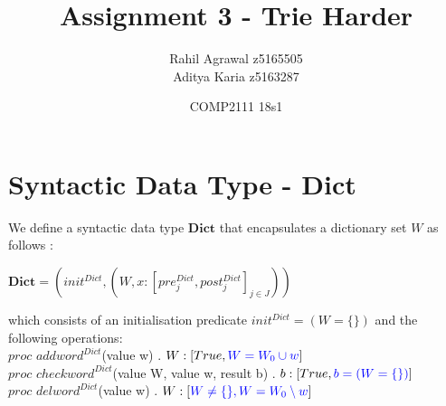 \documentclass[a4paper,11pt,fleqn]{scrartcl}
\title{Assignment 3 - Trie Harder}
\date{COMP2111 18s1}
\author{Rahil Agrawal z5165505\\Aditya Karia z5163287}
\newcommand{\Dict}{\mathbf{Dict}}
\begin{document}
\maketitle
{}

\section{Syntactic Data Type - Dict}
\label{sec:task-1}
We define a syntactic data type $\Dict$ that encapsulates a dictionary set $W$ as follows :
\begin{center}$\Dict = (init^{Dict} , (W,x : [pre_{j}^{Dict}, post_{j}^{Dict}]_{j\in J}))$\end{center}
which consists of an  initialisation predicate \color{blue}$init^{Dict} = (W = \{ \})$ \color{black} and the following operations:\\
$proc$ $addword^{Dict}$(value w) . $W : [True, \color{blue}W = W_{0} \cup w\color{black}]$\\
$proc$ $checkword^{Dict}$(value W, value w, result b) . $b : [True, \color{blue}b = (W = \{ \})\color{black}]$\\
$proc$ $delword^{Dict}$(value w) . $W : [\color{blue}W\neq \{ \}, W = W_{0} \setminus {w}\color{black}]$\\
\end{document}
